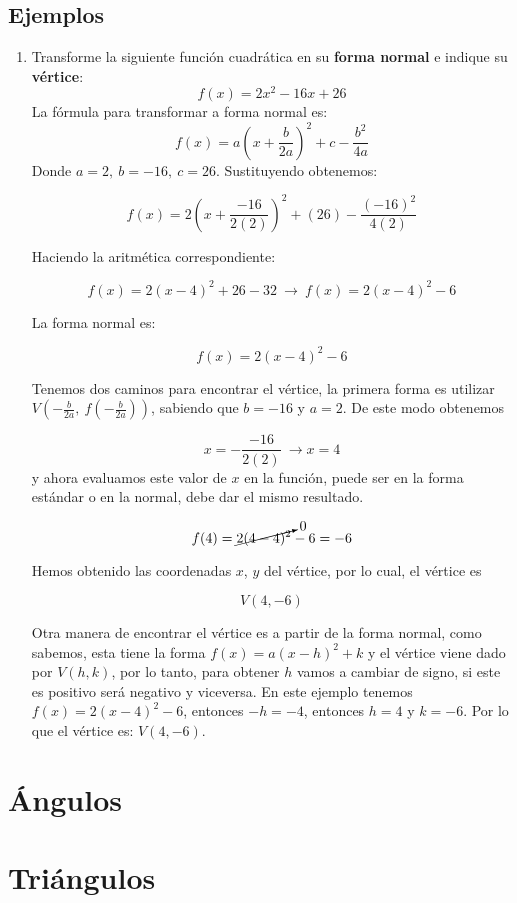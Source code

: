 \documentclass[letterpaper, 10pt, oneside]{book}
\begin{document}
	\section{Ejemplos}
	
	\begin{enumerate}
		\item Transforme la siguiente función cuadrática en su \textbf{forma normal} e indique su \textbf{vértice}: $$f(x)=2x^2-16x+26$$\newline
		La fórmula para transformar a forma normal es: $$f(x)=a\left(x+\frac{b}{2a}\right)^2+c-\frac{b^2}{4a}$$ Donde $a=2, \ b=-16, \ c=26$. Sustituyendo obtenemos:
		
		$$f(x)=2\left(x+\frac{-16}{2(2)}\right)^2+(26)-\frac{(-16)^2}{4(2)}$$
		
		Haciendo la aritmética correspondiente:
		
		$$f(x)=2\left(x-4\right)^2+26-32 \ \rightarrow \ f(x)=2(x-4)^2-6$$
		
		La forma normal es:
		\begin{tcolorbox}[colback=white]
			$$f(x)=2(x-4)^2-6$$
		\end{tcolorbox}
		
		Tenemos dos caminos para encontrar el vértice, la primera forma es utilizar $\displaystyle{V\left(-\frac{b}{2a}, \ f\left(-\frac{b}{2a}\right)\right)}$, sabiendo que $b=-16$ y $a=2$. De este modo obtenemos
		
		$$x=-\frac{-16}{2(2)}\ \rightarrow x=4$$ y ahora evaluamos este valor de $x$ en la función, puede ser en la forma estándar o en la normal, debe dar el mismo resultado.
		
		$$f(4)=\cancelto{0}{2(4-4)^2}-6 = -6$$
		
		Hemos obtenido las coordenadas $x$, $y$ del vértice, por lo cual, el vértice es
		
		\begin{tcolorbox}
			$$V(4, -6)$$
		\end{tcolorbox}
		
		Otra manera de encontrar el vértice es a partir de la forma normal, como sabemos, esta tiene la forma $f(x)=a(x-h)^2+k$ y el vértice viene dado por $V(h, k)$, por lo tanto, para obtener $h$ vamos a cambiar de signo, si este es positivo será negativo y viceversa. En este ejemplo tenemos $f(x)=2(x-4)^2-6$, entonces $-h=-4$, entonces $h=4$ y $k=-6$. Por lo que el vértice es: $V(4, -6)$.
	\end{enumerate}
	\chapter{Ángulos}
	\chapter{Triángulos}
	
\end{document}
